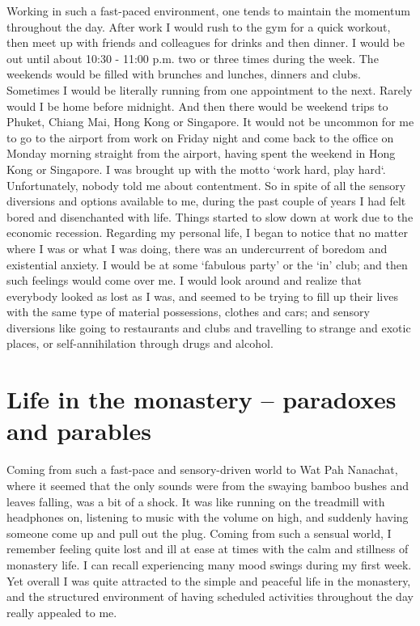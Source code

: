 Working in such a fast-paced environment, one tends to maintain the
momentum throughout the day. After work I would rush to the gym for a
quick workout, then meet up with friends and colleagues for drinks and
then dinner. I would be out until about 10:30 - 11:00 p.m. two or three
times during the week. The weekends would be filled with brunches and
lunches, dinners and clubs. Sometimes I would be literally running from
one appointment to the next. Rarely would I be home before midnight. And
then there would be weekend trips to Phuket, Chiang Mai, Hong Kong or
Singapore. It would not be uncommon for me to go to the airport from
work on Friday night and come back to the office on Monday morning
straight from the airport, having spent the weekend in Hong Kong or
Singapore. I was brought up with the motto `work hard, play hard`. 
Unfortunately, nobody told me about contentment. So in spite of all the
sensory diversions and options available to me, during the past couple
of years I had felt bored and disenchanted with life. Things started to
slow down at work due to the economic recession. Regarding my personal
life, I began to notice that no matter where I was or what I was doing, 
there was an undercurrent of boredom and existential anxiety. I would be
at some `fabulous party' or the `in' club; and then such feelings would
come over me. I would look around and realize that everybody looked as
lost as I was, and seemed to be trying to fill up their lives with the
same type of material possessions, clothes and cars; and sensory
diversions like going to restaurants and clubs and travelling to strange
and exotic places, or self-annihilation through drugs and alcohol. 

\section{Life in the monastery -- paradoxes and parables}

Coming from such a fast-pace and sensory-driven world to Wat Pah
Nanachat, where it seemed that the only sounds were from the swaying
bamboo bushes and leaves falling, was a bit of a shock. It was like
running on the treadmill with headphones on, listening to music with the
volume on high, and suddenly having someone come up and pull out the
plug. Coming from such a sensual world, I remember feeling quite lost
and ill at ease at times with the calm and stillness of monastery life. 
I can recall experiencing many mood swings during my first week. Yet
overall I was quite attracted to the simple and peaceful life in the
monastery, and the structured environment of having scheduled activities
throughout the day really appealed to me. 

